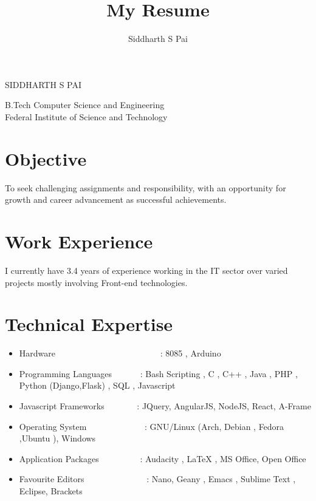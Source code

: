 \documentclass[a4paper]{article}
\title{My Resume}
\author{Siddharth S Pai}
\begin{document}
\pagestyle{empty}
\begin{center}

\Large
\textsc{SIDDHARTH S PAI}
\end{center}
\vspace{1.2\baselineskip}
\begin{flushleft}
B.Tech Computer Science and Engineering\\Federal Institute of Science and Technology 
\end{flushleft}

\section{Objective}
\begin{flushleft}
To seek challenging assignments and responsibility, with an opportunity for growth and career advancement as successful achievements.
\end{flushleft}

\section{Work Experience}
\begin{flushleft}
I currently have 3.4 years of experience working in the IT sector over varied projects mostly involving Front-end technologies.
\end{flushleft}

\section{Technical Expertise}
\begin{itemize}
\item Hardware \indent \ \ \ \ \ \  \  \ \ \ \ \ \ \ \ \ \ \ \ \ \ \ \ \ :  8085 , Arduino
\item Programming Languages \indent \ \ \ \ \ \ : Bash Scripting , C , C++ ,  Java ,  PHP , Python (Django,Flask)  , SQL , Javascript 
\item Javascript Frameworks \indent \ \ \ \ \ \ \ :  JQuery, AngularJS, NodeJS, React, A-Frame
\item Operating System \indent \ \ \ \ \ \ \  \ \ \ \ \ \ : GNU/Linux (Arch, Debian , Fedora ,Ubuntu ), Windows 
\item Application Packages \indent \ \ \ \ \ \ \  \ \ : Audacity , LaTeX ,  MS Office, Open Office
\item Favourite Editors \indent \ \ \ \ \ \ \ \ \ \ \ \ \ \ :  Nano, Geany , Emacs , Sublime Text , Eclipse, Brackets

\end{itemize}
\end{document}
